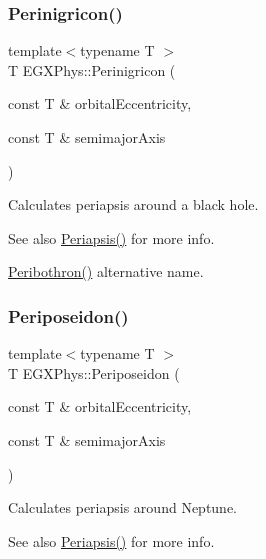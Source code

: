 \subsubsection{\texorpdfstring{Perinigricon()}{Perinigricon()}}
{\footnotesize\ttfamily template$<$typename T $>$ \\
T E\+G\+X\+Phys\+::\+Perinigricon (\begin{DoxyParamCaption}\item[{const T \&}]{orbital\+Eccentricity,  }\item[{const T \&}]{semimajor\+Axis }\end{DoxyParamCaption})}



Calculates periapsis around a black hole. 

\begin{DoxySeeAlso}{See also}
\hyperlink{group___e_g_x_phys-_periapsis_ga4414ac75539371ec874a3d25cad6c9fe}{Periapsis()} for more info. 

\hyperlink{group___e_g_x_phys-_periapsis_gada5892309279a3a687c4eb2f88238e4e}{Peribothron()} alternative name. 
\end{DoxySeeAlso}
\mbox{\label{group___e_g_x_phys-_periapsis_ga237e7af3794202c67e65f64f4c8abc2a}} 
\subsubsection{\texorpdfstring{Periposeidon()}{Periposeidon()}}
{\footnotesize\ttfamily template$<$typename T $>$ \\
T E\+G\+X\+Phys\+::\+Periposeidon (\begin{DoxyParamCaption}\item[{const T \&}]{orbital\+Eccentricity,  }\item[{const T \&}]{semimajor\+Axis }\end{DoxyParamCaption})}



Calculates periapsis around Neptune. 

\begin{DoxySeeAlso}{See also}
\hyperlink{group___e_g_x_phys-_periapsis_ga4414ac75539371ec874a3d25cad6c9fe}{Periapsis()} for more info. 
\end{DoxySeeAlso}
\mbox{\label{group___e_g_x_phys-_periapsis_ga60a50d09d29ebe47cbbfc125c2ea42bf}} 
